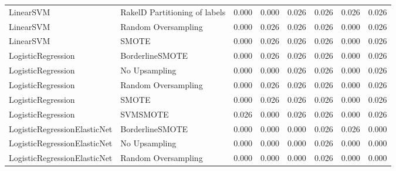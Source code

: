 \begin{tabular}{llllllll}
                      LinearSVM & RakelD Partitioning of labels & 0.000 &                     0.000 &                 0.026 &                  0.026 &                                   0.026 &    0.026 \\
                      LinearSVM &           Random Oversampling & 0.000 &                     0.026 &                 0.026 &                  0.026 &                                   0.000 &    0.026 \\
                      LinearSVM &                         SMOTE & 0.000 &                     0.026 &                 0.026 &                  0.026 &                                   0.000 &    0.026 \\
             LogisticRegression &               BorderlineSMOTE & 0.000 &                     0.026 &                 0.026 &                  0.026 &                                   0.000 &    0.026 \\
             LogisticRegression &                 No Upsampling & 0.000 &                     0.000 &                 0.026 &                  0.026 &                                   0.000 &    0.026 \\
             LogisticRegression &           Random Oversampling & 0.000 &                     0.026 &                 0.026 &                  0.026 &                                   0.000 &    0.026 \\
             LogisticRegression &                         SMOTE & 0.000 &                     0.026 &                 0.026 &                  0.026 &                                   0.000 &    0.026 \\
             LogisticRegression &                      SVMSMOTE & 0.026 &                     0.000 &                 0.026 &                  0.026 &                                   0.000 &    0.026 \\
   LogisticRegressionElasticNet &               BorderlineSMOTE & 0.000 &                     0.000 &                 0.000 &                  0.026 &                                   0.026 &    0.000 \\
   LogisticRegressionElasticNet &                 No Upsampling & 0.000 &                     0.000 &                 0.000 &                  0.026 &                                   0.000 &    0.000 \\
   LogisticRegressionElasticNet &           Random Oversampling & 0.000 &                     0.000 &                 0.000 &                  0.026 &                                   0.000 &    0.000 \\

\end{tabular}
